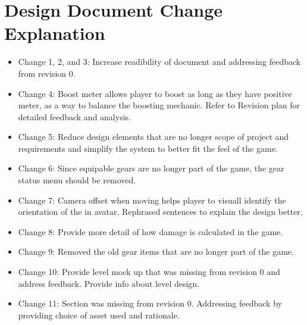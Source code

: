 \documentclass[]{article}
\begin{document}
\section*{Design Document Change Explanation}
\begin{itemize}
	\item Change 1, 2, and 3: Increase readibility of document and addressing feedback from revision 0.
	\item Change 4: Boost meter allows player to boost as long as they have positive meter,  as a way to balance the boosting mechanic. Refer to Revision plan for detailed feedback and analysis.
	\item Change 5: Reduce design elements that are no longer scope of project and requirements and simplify the system to better fit the feel of the game.
	\item Change 6: Since equipable gears are no longer part of the game, the gear status menu should be removed.
	\item Change 7: Camera offset when moving helps player to visuall identify the orientation of the in avatar. Rephrased sentences to explain the design better.
	\item Change 8: Provide more detail of how damage is calculated in the game.
	\item Change 9: Removed the old gear items that are no longer part of the game.
	\item Change 10: Provide level mock up that was missing from revision 0 and address feedback. Provide info about level design.
	\item Change 11: Section was missing from revision 0. Addressing feedback by providing choice of asset used and rationale.
\end{itemize}
\end{document}
